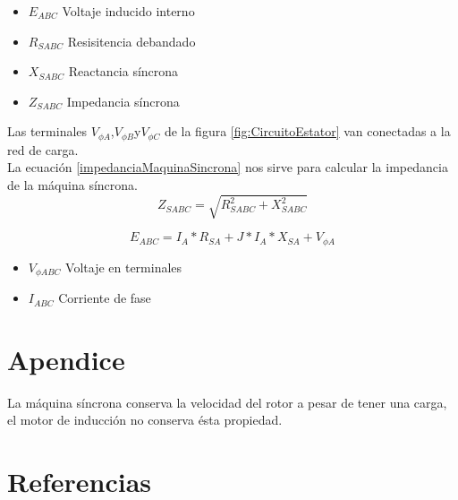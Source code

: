 \documentclass[]{article}
\begin{document}
\begin{itemize}
	\item $E_{ABC}$ Voltaje inducido interno
	\item $R_{SABC}$ Resisitencia debandado
	\item $X_{SABC}$ Reactancia síncrona
	\item $Z_{SABC}$ Impedancia síncrona
\end{itemize} 

Las terminales $V_{\phi A}$,$V_{\phi B}$y$V_{\phi C}$ de la figura \ref*{fig:CircuitoEstator} van conectadas a la red de carga.\\


La ecuación \ref{impedanciaMaquinaSincrona} nos sirve para calcular la impedancia de la máquina síncrona.\\

\begin{equation}
 Z_{SABC}=\sqrt{R_{SABC}^2+X_{SABC}^2}
 \label{impedanciaMaquinaSincrona}
\end{equation}



\begin{equation}
   E_{ABC}=I_A*R_{SA}+J*I_A*X_{SA}+V_{\phi A}
\end{equation}

\begin{itemize}
	\item $V_{\phi ABC}$ Voltaje en terminales
	\item $I_{ABC}$ Corriente de fase 
\end{itemize}

\section{Apendice}

La máquina síncrona conserva la velocidad del rotor a pesar de tener una carga, el motor de inducción no conserva ésta propiedad.\\

\section{Referencias}

%
%
\end{document}
